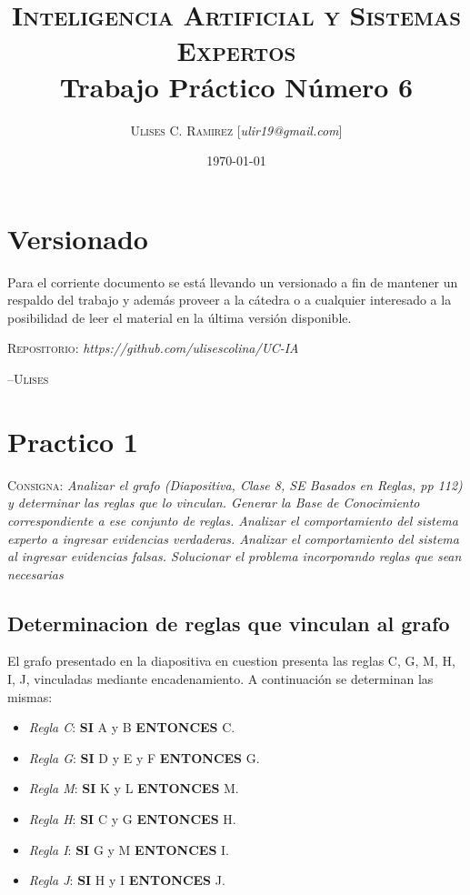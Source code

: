 \documentclass{article}
\title{\textsc{Inteligencia Artificial y Sistemas Expertos}\\Trabajo Práctico
Número 6}
\author{\textsc{Ulises C. Ramirez} [\textit{ulir19@gmail.com}]}
\date{\today}
\begin{document}
\maketitle
{}
\newpage

\section*{Versionado}
Para el corriente documento se est\'a llevando un versionado a fin de mantener
un respaldo del trabajo y adem\'as proveer a la c\'atedra o a cualquier
interesado a la posibilidad de leer el material en la \'ultima versi\'on disponible.\\

\begin{center}
  \textsc{Repositorio}: \textit{https://github.com/ulisescolina/UC-IA}
\end{center}

\hfill--\textsc{Ulises}
\tableofcontents
{}
\newpage

\section{Practico 1}\label{sec:practico1}
\textsc{Consigna}: \textit{Analizar el grafo (Diapositiva, Clase 8, SE Basados
en Reglas, pp 112) y determinar las reglas que lo vinculan. Generar la Base de
Conocimiento correspondiente a ese conjunto de reglas. Analizar el
comportamiento del sistema experto a ingresar evidencias verdaderas. Analizar
el comportamiento del sistema al ingresar evidencias falsas. Solucionar el
problema incorporando reglas que sean necesarias}

\subsection{Determinacion de reglas que vinculan al grafo}
\label{sub:reglas}
El grafo presentado en la diapositiva en cuestion presenta las reglas C, G, M,
H, I, J, vinculadas mediante encadenamiento. A continuación se determinan las
mismas:

\begin{itemize}
	\item \textit{Regla C}: \textbf{SI} A y B \textbf{ENTONCES} C.
	\item \textit{Regla G}: \textbf{SI} D y E y F \textbf{ENTONCES} G.
	\item \textit{Regla M}: \textbf{SI} K y L \textbf{ENTONCES} M.
	\item \textit{Regla H}: \textbf{SI} C y G \textbf{ENTONCES} H.
	\item \textit{Regla I}: \textbf{SI} G y M \textbf{ENTONCES} I.
	\item \textit{Regla J}: \textbf{SI} H y I \textbf{ENTONCES} J.
\end{itemize}
\end{document}
